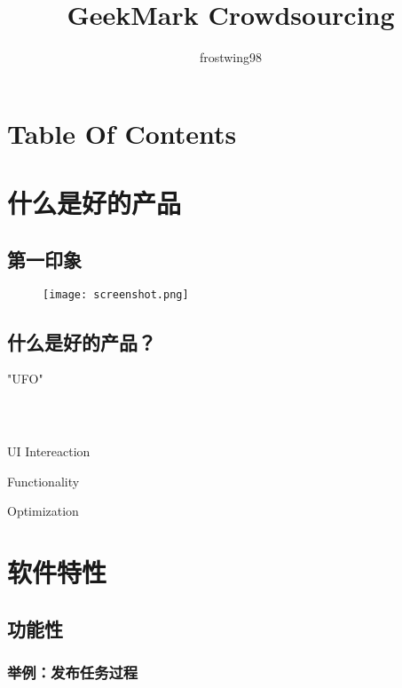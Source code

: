 ﻿\documentclass[utf8]{beamer}
\begin{document}
\title{GeekMark Crowdsourcing}
\author{frostwing98}


  \section*{Table Of Contents}
  \frame {
    \frametitle{\secname}
    \tableofcontents
  }


  \section{什么是好的产品}
  \subsection{第一印象}
  \begin{figure}[]
    \begin{center}
    \texttt{[image: screenshot.png]}
    \end{center}
  \end{figure}

  \subsection{什么是好的产品？}
  \frame
  {
  "UFO"
    \frametitle{\secname~ }
    \begin{block}{UI Intereaction}
    \end{block}
    \begin{block}{Functionality}
    \end{block}
    \begin{block}{Optimization}
    \end{block}
    }
  \section{软件特性}
    \subsection{功能性}
      \subsubsection{举例：发布任务过程}
\end{document}
